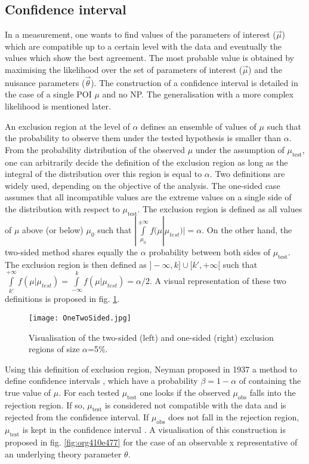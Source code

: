 \subsection{Confidence interval}
\label{sec:org30ef1ce}

In a measurement, one wants to find values of the parameters of interest (\(\vec{\mu}\)) which are compatible up to a certain level with the data and eventually the values which show the best agreement.
The most probable value is obtained by maximising the likelihood over the set of parameters of interest (\(\vec{\mu}\)) and the nuisance parameters (\(\vec{\theta}\)).
The construction of a confidence interval is detailed in the case of a single POI \(\mu\) and no NP.
The generalisation with a more complex likelihood is mentioned later.

An exclusion region at the level of \(\alpha\) defines an ensemble of values of \(\mu\) such that the probability to observe them under the tested hypothesis is smaller than \(\alpha\).
From the probability distribution of the observed \(\mu\) under the assumption of \(\mu_{\text{test}}\), one can arbitrarily decide the definition of the exclusion region as long as the integral of the distribution over this region is equal to $\alpha$.
Two definitions are widely used, depending on the objective of the analysis.
The one-sided case assumes that all incompatible values are the extreme values on a single side of the distribution with respect to \(\mu_{\text{test}}\).
The exclusion region is defined as all values of \(\mu\) above (or below) \(\mu_{\text{0}}\) such that \(|\int\limits_{\mu_0}^{\pm\infty}f(\mu|\mu_{test})|=\alpha\).
On the other hand, the two-sided method shares equally the \(\alpha\) probability between both sides of \(\mu_{\text{test}}\).
The exclusion region is then defined as \(]-\infty,k]\cup[k',+\infty[\)  such that \(\int\limits_{k'}^{+\infty}f(\mu|\mu_{test})=\int\limits^{k}_{-\infty}f(\mu|\mu_{test})=\alpha/2\).
A visual representation of these two definitions is proposed in fig. \ref{fig:org6ce2637}.

\begin{figure}[htbp]
\centering
\texttt{[image: OneTwoSided.jpg]}
\caption{\label{fig:org6ce2637}
Visualisation of the two-sided (left) and one-sided (right) exclusion regions of size \(\alpha\)=5\%.}
\end{figure}

Using this definition of exclusion region, Neyman proposed in 1937 a method to define confidence intervals \cite{Neyman333}, which have a probability $\beta=1-\alpha$ of containing the true value of \(\mu\).
For each tested \(\mu_{\text{test}}\) one looks if the observed \(\mu_{\text{obs}}\) falls into the rejection region.
If so, \(\mu_{\text{test}}\) is considered not compatible with the data and is rejected from the confidence interval.
If \(\mu_{\text{obs}}\) does not fall in the rejection region, \(\mu_{\text{test}}\) is kept in the confidence interval \cite{PDG2016}.
A visualisation of this construction is proposed in fig. \ref{fig:org410e477} for the case of an observable x representative of an underlying theory parameter \(\theta\).

